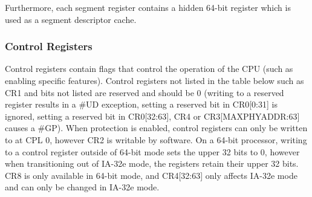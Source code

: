 \documentclass{article}
\newcommand{\layout}[1]{\parbox{\linewidth}{#1}}
\begin{document}
\layout{
  Furthermore, each segment register contains a hidden 64-bit register which is used as a segment descriptor cache.

  \bigskip \cite[Chapter~3.4.3]{sdm3}
}


\layout{
  \subsubsection{Control Registers}

  Control registers contain flags that control the operation of the CPU (such as enabling specific features).
  Control registers not listed in the table below such as CR1 and bits not listed are reserved and should be 0 (writing to a reserved register results in a \#UD exception, setting a reserved bit in CR0[0:31] is ignored, setting a reserved bit in CR0[32:63], CR4 or CR3[MAXPHYADDR:63] causes a \#GP).
  When protection is enabled, control registers can only be written to at CPL 0, however CR2 is writable by software.
  On a 64-bit processor, writing to a control register outside of 64-bit mode sets the upper 32 bits to 0, however when transitioning out of IA-32e mode, the registers retain their upper 32 bits.
  CR8 is only available in 64-bit mode, and CR4[32:63] only affects IA-32e mode and can only be changed in IA-32e mode.
} \bigskip
\end{document}
